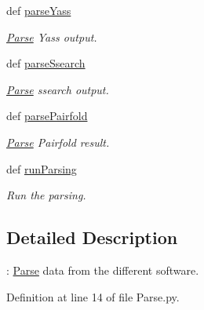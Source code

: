 \begin{DoxyCompactItemize}
def \hyperlink{classirna_1_1iRNA__pred_1_1Parse_1_1Parse_afb8294b2f5b6dee1ca0249574dafe4a6}{parse\-Yass}
\begin{DoxyCompactList}\small\item\em \hyperlink{classirna_1_1iRNA__pred_1_1Parse_1_1Parse}{\-Parse} \-Yass output. \end{DoxyCompactList}\item 
def \hyperlink{classirna_1_1iRNA__pred_1_1Parse_1_1Parse_ac0173165fa6b33b3dd0c2c511f572273}{parse\-Ssearch}
\begin{DoxyCompactList}\small\item\em \hyperlink{classirna_1_1iRNA__pred_1_1Parse_1_1Parse}{\-Parse} ssearch output. \end{DoxyCompactList}\item 
def \hyperlink{classirna_1_1iRNA__pred_1_1Parse_1_1Parse_a3204b7540f86c798b541f15bbad58397}{parse\-Pairfold}
\begin{DoxyCompactList}\small\item\em \hyperlink{classirna_1_1iRNA__pred_1_1Parse_1_1Parse}{\-Parse} \-Pairfold result. \end{DoxyCompactList}\item 
def \hyperlink{classirna_1_1iRNA__pred_1_1Parse_1_1Parse_af2b0aae7d2d3054d4f16db7092c883d5}{run\-Parsing}
\begin{DoxyCompactList}\small\item\em \-Run the parsing. \end{DoxyCompactList}\end{DoxyCompactItemize}


\subsection{\-Detailed \-Description}
\-: \hyperlink{classirna_1_1iRNA__pred_1_1Parse_1_1Parse}{\-Parse} data from the different software. 

\-Definition at line 14 of file \-Parse.\-py.



